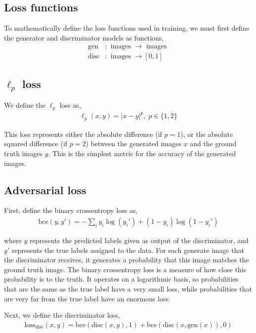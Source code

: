 \documentclass{article}
\begin{document}
\clearpage

\subsection{Loss functions}

To mathematically define the loss functions used in training, we must first define the generator and discriminator models as functions,
\begin{align*}
    \mathrm{gen} &: \textrm{ images } \to \textrm{ images }\\
    \mathrm{disc} &: \textrm{ images } \to [0, 1]
\end{align*}

\subsection*{$\ell_p$ loss}

We define the $\ell_p$ loss as,
\begin{align*}
    \ell_p(x, y) = |x - y|^p,\; p \in \big\{1, 2\big\}
\end{align*}

This loss represents either the absolute difference (if $p = 1$), or the absolute squared difference (if $p = 2$) between the generated images $x$ and the ground truth images $y$. This is the simplest metric for the accuracy of the generated images.

\subsection*{Adversarial loss}

First, define the binary crossentropy loss as,
\begin{align*}
    \mathrm{bce}(y, y') = -\sum_i y_i\log(y_i') + (1-y_i)
    \log(1-y_i')
\end{align*}

where $y$ represents the predicted labels given as output of the discriminator, and $y'$ represents the true labels assigned to the data. For each generate image that the discriminator receives, it generates a probability that this image matches the ground truth image. The binary crossentropy loss is a measure of how close this probability is to the truth. It operates on a logarithmic basis, so probabilities that are the same as the true label have a very small loss, while probabilities that are very far from the true label have an enormous loss.

Next, we define the discriminator loss,
\begin{align*}
    \mathrm{loss}_{\mathrm{disc}}(x, y) =
    \mathrm{bce}(\mathrm{disc}(x, y), 1) +
    \mathrm{bce}(\mathrm{disc}(x, \mathrm{gen}(x)), 0)
\end{align*}
\end{document}

